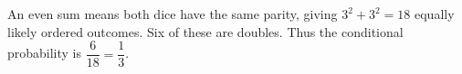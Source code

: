 An even sum means both dice have the same parity, giving $3^2+3^2=18$ equally likely ordered outcomes. Six of these are doubles. Thus the conditional probability is $\dfrac{6}{18}=\boxed{\dfrac{1}{3}}$.
